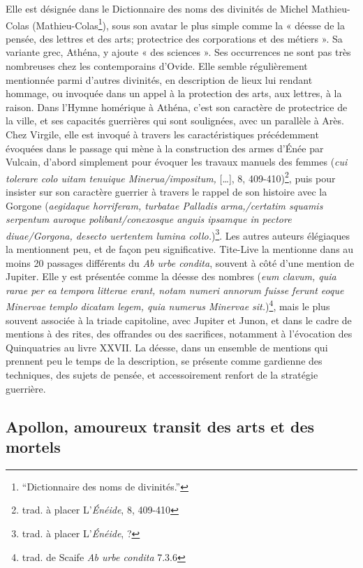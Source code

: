 \documentclass[
  letterpaper,
  DIV=11,
  numbers=noendperiod]{scrreprt}
\begin{document}
Elle est désignée dans le Dictionnaire des noms des divinités de Michel
Mathieu-Colas (Mathieu-Colas\footnote{{``Dictionnaire des noms de
  divinités.''}}), sous son avatar le plus simple comme la « déesse de
la pensée, des lettres et des arts; protectrice des corporations et des
métiers ». Sa variante grec, Athéna, y ajoute « des sciences ». Ses
occurrences ne sont pas très nombreuses chez les contemporains d'Ovide.
Elle semble régulièrement mentionnée parmi d'autres divinités, en
description de lieux lui rendant hommage, ou invoquée dans un appel à la
protection des arts, aux lettres, à la raison. Dans l'Hymne homérique à
Athéna, c'est son caractère de protectrice de la ville, et ses capacités
guerrières qui sont soulignées, avec un parallèle à Arès. Chez Virgile,
elle est invoqué à travers les caractéristiques précédemment évoquées
dans le passage qui mène à la construction des armes d'Énée par Vulcain,
d'abord simplement pour évoquer les travaux manuels des femmes
(\emph{cui tolerare colo uitam tenuique Minerua/impositum,}
{[}\ldots{]}, 8, 409-410)\footnote{trad. à placer L'\emph{Énéide}, 8,
  409-410}, puis pour insister sur son caractère guerrier à travers le
rappel de son histoire avec la Gorgone (\emph{aegidaque horriferam,
turbatae Palladis arma,/certatim squamis serpentum auroque
polibant/conexosque anguis ipsamque in pectore diuae/Gorgona, desecto
uertentem lumina collo.})\footnote{trad. à placer L'\emph{Énéide}, ?}.
Les autres auteurs élégiaques la mentionnent peu, et de façon peu
significative. Tite-Live la mentionne dans au moins 20 passages
différents du \emph{Ab urbe condita}, souvent à côté d'une mention de
Jupiter. Elle y est présentée comme la déesse des nombres (\emph{eum
clavum, quia rarae per ea tempora litterae erant, notam numeri annorum
fuisse ferunt eoque Minervae templo dicatam legem, quia numerus Minervae
sit.})\footnote{trad. de Scaife \emph{Ab urbe condita} 7.3.6}, mais le
plus souvent associée à la triade capitoline, avec Jupiter et Junon, et
dans le cadre de mentions à des rites, des offrandes ou des sacrifices,
notamment à l'évocation des Quinquatries au livre XXVII. La déesse, dans
un ensemble de mentions qui prennent peu le temps de la description, se
présente comme gardienne des techniques, des sujets de pensée, et
accessoirement renfort de la stratégie guerrière.

\subsection{Apollon, amoureux transit des arts et des
mortels}\label{apollon-amoureux-transit-des-arts-et-des-mortels}
\end{document}
